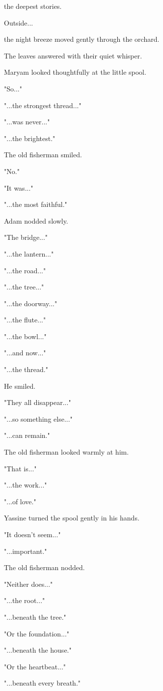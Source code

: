 \documentclass[12pt,openany]{book}
\begin{document}
the deepest stories.

Outside...

the night breeze moved gently through the orchard.

The leaves answered with their quiet whisper.

Maryam looked thoughtfully at the little spool.

"So..."

"...the strongest thread..."

"...was never..."

"...the brightest."

The old fisherman smiled.

"No."

"It was..."

"...the most faithful."

Adam nodded slowly.

"The bridge..."

"...the lantern..."

"...the road..."

"...the tree..."

"...the doorway..."

"...the flute..."

"...the bowl..."

"...and now..."

"...the thread."

He smiled.

"They all disappear..."

"...so something else..."

"...can remain."

The old fisherman looked warmly at him.

"That is..."

"...the work..."

"...of love."

Yassine turned the spool gently in his hands.

"It doesn't seem..."

"...important."

The old fisherman nodded.

"Neither does..."

"...the root..."

"...beneath the tree."

"Or the foundation..."

"...beneath the house."

"Or the heartbeat..."

"...beneath every breath."
\end{document}
